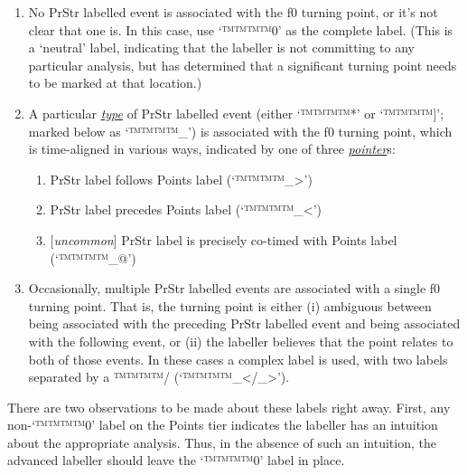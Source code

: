 \documentclass[11pt, twoside]{memoir}
\begin{document}
\begin{enumerate} \def\labelenumi{\arabic{enumi}.}
\item No PrStr labelled event is associated with the f0 turning point, or it’s not clear that one is. In this case, use ‘™™™™{0}’ as the complete label. (This is a ‘neutral’ label, indicating that the labeller is not committing to any particular analysis, but has determined that a significant turning point needs to be marked at that location.)
\item A particular \textit{\uline{type}} of PrStr labelled event (either ‘™™™™{*}’ or ‘™™™™{]}’; marked below as ‘™™™™{\_}’) is associated with the f0 turning point, which is time-aligned in various ways, indicated by one of three \textit{\uline{pointer}}s:

 \begin{enumerate} \def\labelenumii{\alph{enumii}.}
\item PrStr label follows Points label (‘™™™™{\_>}’)
\item PrStr label precedes Points label (‘™™™™{\_<}’)
\item {[\textit{uncommon}]} PrStr label is precisely co-timed with Points label (‘™™™™{\_@}’) \end{enumerate}
\item Occasionally, multiple PrStr labelled events are associated with a single f0 turning point. That is, the turning point is either (i) ambiguous between being associated with the preceding PrStr labelled event and being associated with the following event, or (ii) the labeller believes that the point relates to both of those events. In these cases a complex label is used, with two labels separated by a ™™™™{/} (‘™™™™{\_</\_>}’). \end{enumerate}

There are two observations to be made about these labels right away. First, any non-‘™™™™{0}’ label on the Points tier indicates the labeller has an intuition about the appropriate analysis. Thus, in the absence of such an intuition, the advanced labeller should leave the ‘™™™™{0}’ label in place.
\end{document}
